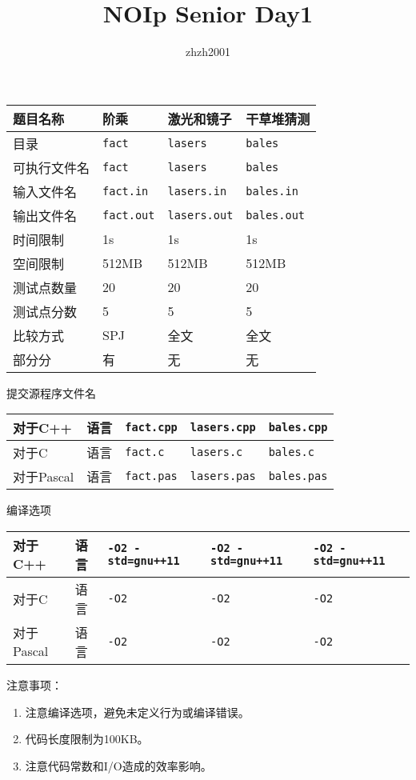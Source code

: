 \documentclass[hyperref,UTF8,12pt,a4paper]{ctexart}
\title{NOIp Senior Day1}
\author{zhzh2001}
\date{}
\begin{document}
\maketitle

\begin{center}
\begin{tabular}{|p{100pt}|p{100pt}|p{100pt}|p{100pt}|}
\hline
题目名称 & 阶乘 & 激光和镜子 & 干草堆猜测\\
\hline
目录 & \verb|fact| & \verb|lasers| & \verb|bales|\\
\hline
可执行文件名 & \verb|fact| & \verb|lasers| & \verb|bales|\\
\hline
输入文件名 & \verb|fact.in| & \verb|lasers.in| & \verb|bales.in|\\
\hline
输出文件名 & \verb|fact.out| & \verb|lasers.out| & \verb|bales.out|\\
\hline
时间限制 & 1s & 1s & 1s\\
\hline
空间限制 & 512MB & 512MB & 512MB\\
\hline
测试点数量 & 20 & 20 & 20\\
\hline
测试点分数 & 5 & 5 & 5\\
\hline
比较方式 & SPJ & 全文 & 全文\\
\hline
部分分 & 有 & 无 & 无\\
\hline
\end{tabular}
\end{center}
提交源程序文件名
\begin{center}
\begin{tabular}{|p{60pt}p{28pt}|p{100pt}|p{100pt}|p{100pt}|}
\hline
对于C++ & 语言 & \verb|fact.cpp|& \verb|lasers.cpp| & \verb|bales.cpp| \\
\hline
对于C & 语言 & \verb|fact.c| & \verb|lasers.c| & \verb|bales.c|\\
\hline
对于Pascal & 语言 & \verb|fact.pas|& \verb|lasers.pas| & \verb|bales.pas|\\
\hline
\end{tabular}
\end{center}
编译选项
\begin{center}
\begin{tabular}{|p{60pt}p{28pt}|p{100pt}|p{100pt}|p{100pt}|}
\hline
对于C++ & 语言 & \verb|-O2 -std=gnu++11| & \verb|-O2 -std=gnu++11| & \verb|-O2 -std=gnu++11|\\
\hline
对于C & 语言 & \verb|-O2| & \verb|-O2| & \verb|-O2|\\
\hline
对于Pascal & 语言 & \verb|-O2| & \verb|-O2| & \verb|-O2|\\
\hline
\end{tabular}
\end{center}
注意事项：
\begin{enumerate}
\item 注意编译选项，避免未定义行为或编译错误。
\item 代码长度限制为100KB。
\item 注意代码常数和I/O造成的效率影响。
\end{enumerate}
\end{document}
